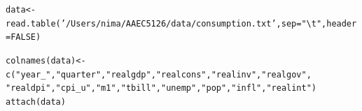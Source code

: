\documentclass[11pt,reqno]{amsart}\usepackage[]{graphicx}\usepackage[]{color}
\makeatletter
\newcommand{\hlnum}[1]{\textcolor[rgb]{0.063,0.58,0.627}{#1}}%
\newcommand{\hlstr}[1]{\textcolor[rgb]{0.063,0.58,0.627}{#1}}%
\newcommand{\hlstd}[1]{\textcolor[rgb]{0.196,0.196,0.196}{#1}}%
\newcommand{\hlkwb}[1]{\textcolor[rgb]{0.627,0,0.314}{#1}}%
\newcommand{\hlkwc}[1]{\textcolor[rgb]{0,0.631,0.314}{#1}}%
\newcommand{\hlkwd}[1]{\textcolor[rgb]{0.78,0.227,0.412}{#1}}%
\newenvironment{kframe}{%
 \def\at@end@of@kframe{}%
 \ifinner\ifhmode%
  \def\at@end@of@kframe{\end{minipage}}%
  \begin{minipage}{\columnwidth}%
 \fi\fi%
 \def\FrameCommand##1{\hskip\@totalleftmargin \hskip-\fboxsep
 \colorbox{shadecolor}{##1}\hskip-\fboxsep
     \hskip-\linewidth \hskip-\@totalleftmargin \hskip\columnwidth}%
 \MakeFramed {\advance\hsize-\width
   \@totalleftmargin\z@ \linewidth\hsize
   \@setminipage}}%
 {\par\unskip\endMakeFramed%
 \at@end@of@kframe}
\newenvironment{knitrout}{}{} %
\makeatother
\begin{document}
\begin{knitrout}
\color{fgcolor}\begin{kframe}
\begin{alltt}
\hlstd{data} \hlkwb{<-} \hlkwd{read.table}\hlstd{(}\hlstr{'/Users/nima/AAEC5126/data/consumption.txt'}\hlstd{,} \hlkwc{sep}\hlstd{=}\hlstr{"\textbackslash{}t"}\hlstd{,} \hlkwc{header}\hlstd{=}\hlnum{FALSE}\hlstd{)}

\hlkwd{colnames}\hlstd{(data)} \hlkwb{<-} \hlkwd{c}\hlstd{(}\hlstr{"year_"}\hlstd{,} \hlstr{"quarter"}\hlstd{,} \hlstr{"realgdp"}\hlstd{,} \hlstr{"realcons"}\hlstd{,}\hlstr{"realinv"}\hlstd{,} \hlstr{"realgov"}\hlstd{,}
                   \hlstr{"realdpi"}\hlstd{,} \hlstr{"cpi_u"}\hlstd{,} \hlstr{"m1"}\hlstd{,} \hlstr{"tbill"}\hlstd{,} \hlstr{"unemp"}\hlstd{,} \hlstr{"pop"}\hlstd{,} \hlstr{"infl"}\hlstd{,} \hlstr{"realint"}\hlstd{)}
\hlkwd{attach}\hlstd{(data)}
\end{alltt}
\end{kframe}
\end{knitrout}
\end{document}
